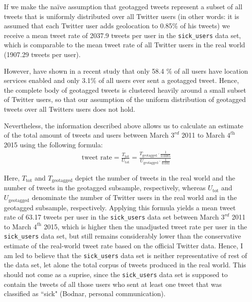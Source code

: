 \documentclass[11pt, a4paper,twoside]{report}\usepackage[]{graphicx}\usepackage[]{color}
\begin{document}
If we make the naïve assumption that geotagged tweets represent a subset of all tweets that is uniformly distributed over all Twitter users (in other words: it is assumed that each Twitter user adds geolocation to 0.85\% of his tweets) we receive a mean tweet rate of 2037.9 tweets per user in the \texttt{sick\_users} data set, which is comparable to the mean tweet rate of all Twitter users in the real world (1907.29 tweets per user).

However, \cite{sloan_who_2015} have shown in a recent study that only 58.4 \% of all users have location services enabled and only 3.1\% of all users ever sent a geotagged tweet. Hence, the complete body of geotagged tweets is clustered heavily around a small subset of Twitter users, so that our assumption of the uniform distribution of geotagged tweets over all Twitters users does not hold.

Nevertheless, the information described above allows us to calculate an estimate of the total amount of tweets and users between March $3^\textit{rd}$ 2011 to March $4^\textit{th}$ 2015 using the following formula:
  \begin{align}
\text{tweet rate} = \frac{T_{\text{tot}}}{U_\text{tot}} = \frac{T_{\text{geotagged}} \cdot \frac{1}{0.0085}}{U_\text{geotagged} \cdot \frac{1}{0.031}} \label{eq:3}
  \end{align}

Here, $T_\text{tot}$ and $T_\text{geotagged}$ depict the number of tweets in the real world and the number of tweets in the geotagged subsample, respectively, whereas $U_\text{tot}$ and $U_\text{geotagged}$ denominate the number of Twitter users in the real world and in the geotagged subsample, respectively. 
Applying this formula yields a mean tweet rate of 63.17 tweets per user in the \texttt{sick\_users} data set between March $3^\textit{rd}$ 2011 to March $4^\textit{th}$ 2015, which is higher then the unadjusted tweet rate per user in the \texttt{sick\_users} data set, but still remains considerably lower than the conservative estimate of the real-world tweet rate based on the official Twitter data. Hence, I am led to believe that the \texttt{sick\_users} data set is neither representative of rest of the data set, let alone the total corpus of tweets produced in the real world. This should not come as a suprise, since the \texttt{sick\_users} data set is supposed to contain the tweets of all those users who sent at least one tweet that was classified as ``sick" (Bodnar, personal communication).
\end{document}
